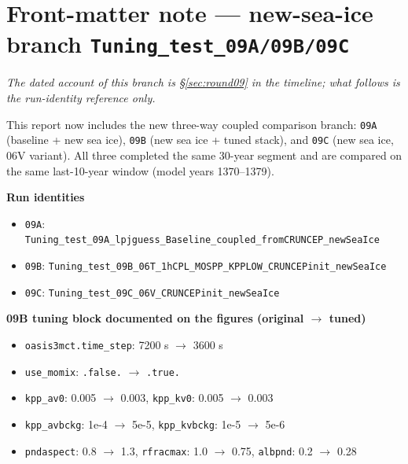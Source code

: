 \documentclass[10pt]{article}
\begin{document}
\begin{abstract}
\medskip\noindent Read \S\ref{sec:causal} for the causal web and what is still dark;
\S\ref{sec:obs} for what the observations can and cannot settle; \S\ref{sec:falsified} for
every mechanism this campaign has killed, with the measurement that killed it. Parts~I--III
are the coupled work that preceded the AMIP testbed; Part~IV is the atmosphere-only campaign
in the order it happened.
\end{abstract}

\section*{Front-matter note --- new-sea-ice branch \texttt{Tuning\_test\_09A/09B/09C}}

\emph{The dated account of this branch is \S\ref{sec:round09} in the timeline; what follows is the run-identity reference only.}


This report now includes the new three-way coupled comparison branch:
\texttt{09A} (baseline + new sea ice), \texttt{09B} (new sea ice + tuned stack), and
\texttt{09C} (new sea ice, 06V variant). All three completed the same 30-year
segment and are compared on the same last-10-year window (model years 1370--1379).

\textbf{Run identities}
\begin{itemize}
\item \texttt{09A}: \texttt{Tuning\_test\_09A\_lpjguess\_Baseline\_coupled\_fromCRUNCEP\_newSeaIce}
\item \texttt{09B}: \texttt{Tuning\_test\_09B\_06T\_1hCPL\_MOSPP\_KPPLOW\_CRUNCEPinit\_newSeaIce}
\item \texttt{09C}: \texttt{Tuning\_test\_09C\_06V\_CRUNCEPinit\_newSeaIce}
\end{itemize}

\textbf{09B tuning block documented on the figures (original $\rightarrow$ tuned)}
\begin{itemize}
\item \texttt{oasis3mct.time\_step}: 7200 s $\rightarrow$ 3600 s
\item \texttt{use\_momix}: \texttt{.false.} $\rightarrow$ \texttt{.true.}
\item \texttt{kpp\_av0}: 0.005 $\rightarrow$ 0.003, \texttt{kpp\_kv0}: 0.005 $\rightarrow$ 0.003
\item \texttt{kpp\_avbckg}: 1e-4 $\rightarrow$ 5e-5, \texttt{kpp\_kvbckg}: 1e-5 $\rightarrow$ 5e-6
\item \texttt{pndaspect}: 0.8 $\rightarrow$ 1.3, \texttt{rfracmax}: 1.0 $\rightarrow$ 0.75, \texttt{albpnd}: 0.2 $\rightarrow$ 0.28
\end{itemize}
\end{document}
